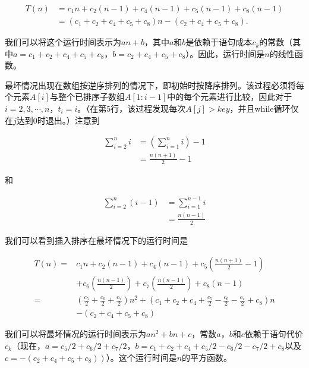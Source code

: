 \documentclass[lang=cn,newtx,10pt,scheme=chinese]{elegantbook}
\begin{document}
\begin{equation}
\begin{aligned}
T(n) & =c_1 n+c_2(n-1)+c_4(n-1)+c_5(n-1)+c_8(n-1) \\
& =\left(c_1+c_2+c_4+c_5+c_8\right) n-\left(c_2+c_4+c_5+c_8\right) .
\end{aligned}
\end{equation}

我们可以将这个运行时间表示为$an+b$，其中$a$和$b$是依赖于语句成本$c_k$的常数（其中$a = c_1 + c_2 + c_4 + c_5 + c_8$，$b = c_2 + c_4 + c_5 + c_8$）。因此，运行时间是$n$的线性函数。

最坏情况出现在数组按逆序排列的情况下，即初始时按降序排列。该过程必须将每个元素$A[i]$与整个已排序子数组$A[1:i-1]$中的每个元素进行比较，因此对于$i=2,3,\cdots,n$，$t_i = i$。（在第5行，该过程发现每次$A[j] > key$，并且while循环仅在$j$达到0时退出。）注意到

\begin{equation*}
\begin{aligned}
\sum_{i=2}^n i & =\left(\sum_{i=1}^n i\right)-1 \\
& =\frac{n(n+1)}{2}-1
\end{aligned}
\end{equation*}

和

\begin{equation*}
\begin{aligned}
\sum_{i=2}^n(i-1) & =\sum_{i=1}^{n-1} i \\
& =\frac{n(n-1)}{2}
\end{aligned}
\end{equation*}

我们可以看到插入排序在最坏情况下的运行时间是

\begin{equation}
\begin{aligned}
T(n)= & c_1 n+c_2(n-1)+c_4(n-1)+c_5\left(\frac{n(n+1)}{2}-1\right) \\
& +c_6\left(\frac{n(n-1)}{2}\right)+c_7\left(\frac{n(n-1)}{2}\right)+c_8(n-1) \\
= & \left(\frac{c_5}{2}+\frac{c_6}{2}+\frac{c_7}{2}\right) n^2+\left(c_1+c_2+c_4+\frac{c_5}{2}-\frac{c_6}{2}-\frac{c_7}{2}+c_8\right) n \\
& -\left(c_2+c_4+c_5+c_8\right)
\end{aligned}
\end{equation}

我们可以将最坏情况的运行时间表示为$an^2+bn+c$，常数$a$，$b$和$c$依赖于语句代价$c_k$（现在，$a=c_5 / 2+c_6 / 2+c_7 / 2$，$b=c_1+c_2+c_4+c_5 / 2-c_6 / 2-c_7 / 2+c_8$以及$\left.c=-\left(c_2+c_4+c_5+c_8\right)\right)$）。这个运行时间是$n$的平方函数。
\end{document}
